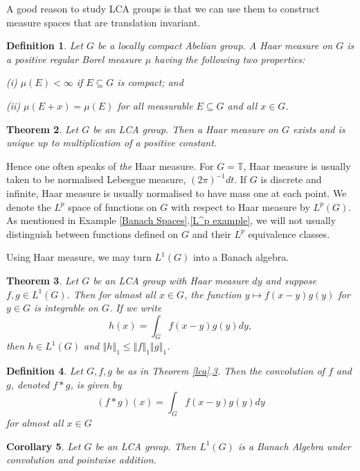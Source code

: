 \documentclass[12pt]{UNSWthesis}
\newcommand{\T}{\mathbb{T}}
\newcommand{\reff}[2]{\ref{#1}.\ref{#2}}
\def\norm#1{\left \Vert #1 \right \Vert}
\newtheorem{theorem}{Theorem}[section]
\newtheorem{corollary}[theorem]{Corollary}
\newtheorem{definition}[theorem]{Definition}
\numberwithin{equation}{section}
\begin{document}
A good reason to study LCA groups is
that we can use them to construct measure spaces that are translation invariant.

\begin{definition} Let $G$ be a locally compact Abelian group. A {\em Haar
measure} on $G$ is a positive regular Borel measure $\mu$ having the
following two properties:

(i) $\mu(E)<\infty$ if $E\subseteq G$ is compact; and

(ii) $\mu(E+x)=\mu(E)$ for all measurable $E\subseteq G$ and all $x\in G$.
\end{definition}

\begin{theorem}\cite[Chapter VII, \S 2]{Katznelson}
Let $G$ be an LCA group. Then a Haar measure on $G$ exists and is unique up to
multiplication of a positive constant.
\end{theorem}

Hence one often speaks of {\em the} Haar measure. For $G=\T$, Haar measure is
usually taken to be normalised
Lebesgue measure, $(2\pi)^{-1}dt$. If $G$ is discrete and infinite, Haar measure
is usually
normalised to have mass one at each point. We denote the $L^p$ space of
functions on $G$ with respect to Haar measure by $L^p(G)$. As mentioned in
Example \reff{Banach Spaces}{L^p example}, we will not usually distinguish
between functions defined on $G$ and their $L^p$ equivalence classes.

Using Haar measure, we may turn $L^1(G)$ into a Banach algebra.

\begin{theorem}\label{convolution}
Let $G$ be an LCA group with Haar measure $dy$
and suppose $f,g\in L^1(G)$. Then for almost all $x\in G$, the function
$y\mapsto f(x-y)g(y)$ for $y\in G$ is integrable on $G$.
If we write 
\[h(x)=\int_G f(x-y)g(y)dy,\]
then $h\in L^1(G)$ and $\norm{h}_1\leq\norm{f}_1\norm{g}_1$.
\end{theorem}

\begin{definition} Let $G,f,g$ be as in Theorem \reff{lca}{convolution}. Then
the {\em convolution} of $f$ and $g$, denoted $f*g$, is given by
\[(f*g)(x)=\int_G f(x-y)g(y)dy\]
for almost all $x\in G$
\end{definition}

\begin{corollary} Let $G$ be an LCA group. Then $L^1(G)$ is a
Banach Algebra under convolution and pointwise addition.
\end{corollary}
\end{document}
